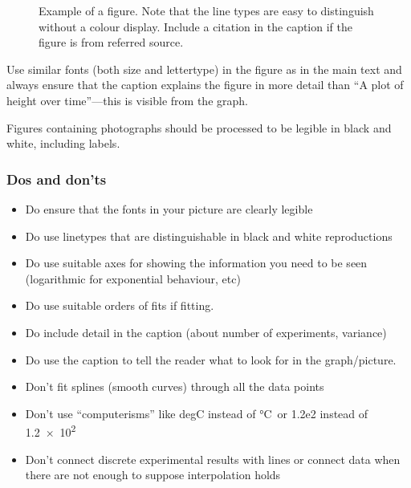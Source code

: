 \documentclass[a5paper, 10pt]{article}
\begin{document}
\begin{figure}[htbp]
  \centering
  \caption{Example of a figure.  Note that the line types are easy to
    distinguish without a colour display.  Include a citation in the caption if the figure is from referred source.}
  \label{fig:figexample}
\end{figure}

Use similar fonts (both size and lettertype) in the figure as in the
main text and always ensure that the caption explains the figure in
more detail than ``A plot of height over time''---this is visible from the
graph.

Figures containing photographs should be processed to be legible in
black and white, including labels.

\subsubsection*{Dos and don'ts}
\begin{itemize}
\item Do ensure that the fonts in your picture are clearly legible
\item Do use linetypes that are distinguishable in black and white reproductions
\item Do use suitable axes for showing the information you need to be seen (logarithmic for exponential behaviour, etc)
\item Do use suitable orders of fits if fitting.
\item Do include detail in the caption (about number of experiments, variance)
\item Do use the caption to tell the reader what to look for in the graph/picture.
\end{itemize}

\begin{itemize}
\item Don't fit splines (smooth curves) through all the data points 
\item Don't use ``computerisms'' like degC instead of \si{\celsius}\ or 1.2e2 instead of \num{1.2e2} 
\item Don't connect discrete experimental results with lines or connect data when there are not enough to suppose interpolation holds
\end{itemize}
\end{document}
